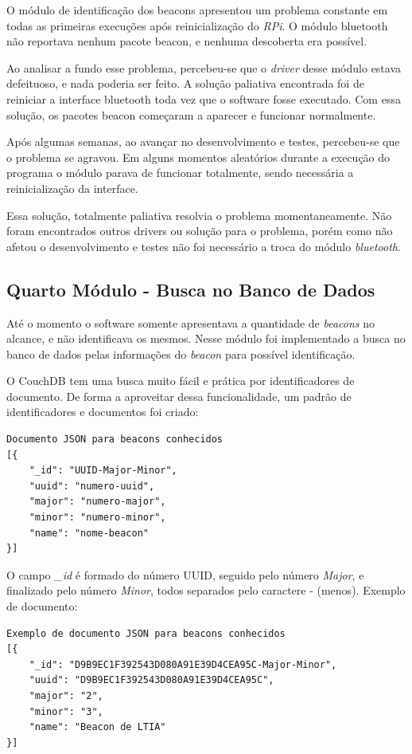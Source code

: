 \documentclass[
		12pt,				%
		openright,			%
		oneside,			%
		a4paper,			%
		chapter=TITLE,		%
		english,			%
		brazil				%
	]{abntex2}
\begin{document}
O módulo de identificação dos beacons apresentou um problema constante em todas as primeiras execuções após reinicialização do \textit{RPi}. O módulo bluetooth não reportava nenhum pacote beacon, e nenhuma descoberta era possível. 

Ao analisar a fundo esse problema, percebeu-se que o \textit{driver} desse módulo estava defeituoso, e nada poderia ser feito. A solução paliativa encontrada foi de reiniciar a interface bluetooth toda vez que o software fosse executado. Com essa solução, os pacotes beacon começaram a aparecer e funcionar normalmente.

Após algumas semanas, ao avançar no desenvolvimento e testes, percebeu-se que o problema se agravou. Em alguns momentos aleatórios durante a execução do programa o módulo parava de funcionar totalmente, sendo necessária a reinicialização da interface.

Essa solução, totalmente paliativa resolvia o problema momentaneamente. Não foram encontrados outros drivers ou solução para o problema, porém como não afetou o desenvolvimento e testes não foi necessário a troca do módulo \textit{bluetooth}.

\subsection{Quarto Módulo - Busca no Banco de Dados}\label{sec:quarto-modulo}

Até o momento o software somente apresentava a quantidade de \textit{beacons} no alcance, e não identificava os mesmos. Nesse módulo foi implementado a busca no banco de dados pelas informações do \textit{beacon} para possível identificação.

O CouchDB tem uma busca muito fácil e prática por identificadores de documento. De forma a aproveitar dessa funcionalidade, um padrão de identificadores e documentos foi criado:

\begin{verbatim}
Documento JSON para beacons conhecidos
[{
    "_id": "UUID-Major-Minor",
    "uuid": "numero-uuid",
    "major": "numero-major",
    "minor": "numero-minor",
    "name": "nome-beacon"
}]
\end{verbatim}

O campo \textit{\_id} é formado do número UUID, seguido pelo número \textit{Major}, e finalizado pelo número \textit{Minor}, todos separados pelo caractere - (menos). Exemplo de documento:

\begin{verbatim}
Exemplo de documento JSON para beacons conhecidos
[{
    "_id": "D9B9EC1F392543D080A91E39D4CEA95C-Major-Minor",
    "uuid": "D9B9EC1F392543D080A91E39D4CEA95C",
    "major": "2",
    "minor": "3",
    "name": "Beacon de LTIA"
}]
\end{verbatim}
\end{document}
